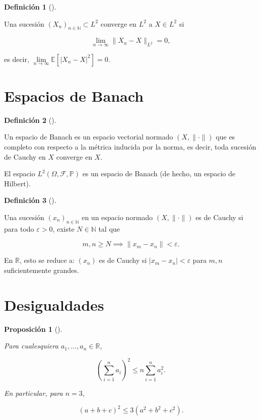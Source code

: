 \documentclass[
  spanish,
  us-letterpaper,
]{scrreprt}
\theoremstyle{plain}
\theoremstyle{plain}
\newtheorem{proposition}{Proposición}[chapter]
\theoremstyle{definition}
\newtheorem{definition}{Definición}[chapter]
\theoremstyle{plain}
\theoremstyle{remark}
\begin{document}
\begin{definition}[]\protect\hypertarget{def-conv_l2}{}\label{def-conv_l2}

Una sucesión \((X_n)_{n \in \mathbb{N}} \subset L^2\) converge en
\(L^2\) a \(X \in L^2\) si

\[
\lim_{n \to \infty} \|X_n - X\|_{L^2} = 0,
\]

es decir, \(\lim\limits_{n \to \infty} \mathbb{E}[|X_n - X|^2] = 0\).

\end{definition}

\section{Espacios de Banach}\label{espacios-de-banach}

\begin{definition}[]\protect\hypertarget{def-esp_banach}{}\label{def-esp_banach}

Un espacio de Banach es un espacio vectorial normado \((X, \|\cdot\|)\)
que es completo con respecto a la métrica inducida por la norma, es
decir, toda sucesión de Cauchy en \(X\) converge en \(X\).

\end{definition}

El espacio \(L^2(\Omega, \mathcal{F}, \mathbb{P})\) es un espacio de
Banach (de hecho, un espacio de Hilbert).

\begin{definition}[]\protect\hypertarget{def-criterio_cauchy_esp_norm}{}\label{def-criterio_cauchy_esp_norm}

Una sucesión \((x_n)_{n \in \mathbb{N}}\) en un espacio normado
\((X, \|\cdot\|)\) es de Cauchy si para todo \(\varepsilon > 0\), existe
\(N \in \mathbb{N}\) tal que

\[
m, n \geq N \implies \|x_m - x_n\| < \varepsilon.
\]

\end{definition}

En \(\mathbb{R}\), esto se reduce a: \((x_n)\) es de Cauchy si
\(|x_m - x_n| < \varepsilon\) para \(m, n\) suficientemente grandes.

\section{Desigualdades}\label{desigualdades}

\begin{proposition}[]\protect\hypertarget{prp-des_triangulo}{}\label{prp-des_triangulo}

Para cualesquiera \(a_1, \dots, a_n \in \mathbb{R}\),

\[
\left( \sum_{i=1}^n a_i \right)^2 \leq n \sum_{i=1}^n a_i^2.
\]

En particular, para \(n = 3\),

\[
(a + b + c)^2 \leq 3(a^2 + b^2 + c^2).
\]

\end{proposition}
\end{document}
